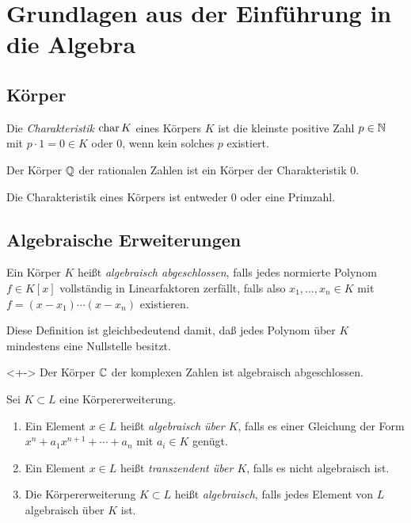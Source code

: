 \section{Grundlagen aus der Einführung in die Algebra}


\subsection{Körper}

\begin{definition}
	Die \emph{Charakteristik \(\operatorname{char} K\)} eines Körpers \(K\) ist die
	kleinste positive Zahl \(p \in \mathbb N\) mit \(p \cdot 1 = 0 \in K\) oder
	\(0\), wenn kein solches \(p\) existiert.
\end{definition}

\begin{example}
	Der Körper \(\mathbb Q\) der rationalen Zahlen ist ein Körper der
	Charakteristik \(0\).
\end{example}

\begin{proposition}
	Die Charakteristik eines Körpers ist entweder \(0\) oder eine Primzahl.
\end{proposition}

\subsection{Algebraische Erweiterungen}

\begin{definition}
	Ein Körper \(K\) heißt \emph{algebraisch abgeschlossen}, falls
	jedes normierte Polynom \(f \in K[x]\) vollständig in Linearfaktoren zerfällt,
	falls also \(x_1, \dotsc, x_n \in K\) mit \(f = (x - x_1) \dotsm (x - x_n)\) existieren.
\end{definition}

Diese Definition ist gleichbedeutend damit, daß jedes Polynom über \(K\) mindestens eine Nullstelle besitzt.

\begin{example}<+->
	Der Körper \(\mathbb C\) der komplexen Zahlen ist algebraisch abgeschlossen.
\end{example}

\begin{definition}
	Sei \(K \subset L\) eine Körpererweiterung.
	\begin{enumerate}
	\item
		Ein Element \(x \in L\) heißt \emph{algebraisch über \(K\)}, falls es
		einer Gleichung der Form \(x^n + a_1 x^{n + 1} + \dotsb + a_n\) mit \(a_i \in K\)
		genügt.
	\item
		Ein Element \(x \in L\) heißt \emph{transzendent über \(K\)}, falls es
		nicht algebraisch ist.
	\item
		Die Körpererweiterung \(K \subset L\) heißt \emph{algebraisch}, falls jedes
		Element von \(L\) algebraisch über \(K\) ist.
	\end{enumerate}
\end{definition}

